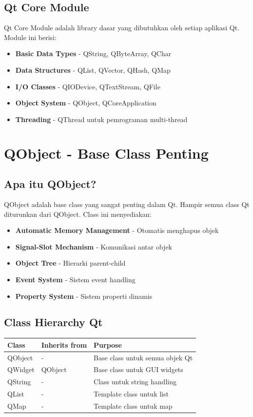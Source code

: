 \subsection{Qt Core Module}

Qt Core Module adalah library dasar yang dibutuhkan oleh setiap aplikasi Qt. Module ini berisi:

\begin{itemize}
\item \textbf{Basic Data Types} - QString, QByteArray, QChar
\item \textbf{Data Structures} - QList, QVector, QHash, QMap
\item \textbf{I/O Classes} - QIODevice, QTextStream, QFile
\item \textbf{Object System} - QObject, QCoreApplication
\item \textbf{Threading} - QThread untuk pemrograman multi-thread
\end{itemize}

\section{QObject - Base Class Penting}

\subsection{Apa itu QObject?}

QObject adalah base class yang sangat penting dalam Qt. Hampir semua class Qt diturunkan dari QObject. Class ini menyediakan:

\begin{itemize}
\item \textbf{Automatic Memory Management} - Otomatis menghapus objek
\item \textbf{Signal-Slot Mechanism} - Komunikasi antar objek
\item \textbf{Object Tree} - Hierarki parent-child
\item \textbf{Event System} - Sistem event handling
\item \textbf{Property System} - Sistem properti dinamis
\end{itemize}

\subsection{Class Hierarchy Qt}

\begin{center}
\begin{tabular}{|l|l|l|}
\hline
\textbf{Class} & \textbf{Inherits from} & \textbf{Purpose} \\
\hline
QObject & - & Base class untuk semua objek Qt \\
\hline
QWidget & QObject & Base class untuk GUI widgets \\
\hline
QString & - & Class untuk string handling \\
\hline
QList & - & Template class untuk list \\
\hline
QMap & - & Template class untuk map \\
\hline
\end{tabular}
\end{center}

